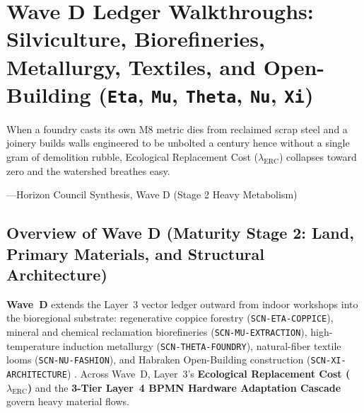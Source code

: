 \chapter{Wave D Ledger Walkthroughs: Silviculture, Biorefineries, Metallurgy, Textiles, and Open-Building (\texttt{Eta}, \texttt{Mu}, \texttt{Theta}, \texttt{Nu}, \texttt{Xi})}
\label{ch:wave-d-walkthroughs}

\epigraph{When a foundry casts its own M8 metric dies from reclaimed scrap steel and a joinery builds walls engineered to be unbolted a century hence without a single gram of demolition rubble, Ecological Replacement Cost ($\lambda_{\mathrm{ERC}}$) collapses toward zero and the watershed breathes easy.}{---Horizon Council Synthesis, Wave D (Stage 2 Heavy Metabolism)}

\section{Overview of Wave D (Maturity Stage 2: Land, Primary Materials, and Structural Architecture)}
\label{sec:ch12-overview}

\textbf{Wave~D} extends the Layer~3 vector ledger outward from indoor workshops into the bioregional substrate: regenerative coppice forestry (\texttt{SCN-ETA-COPPICE}), mineral and chemical reclamation biorefineries (\texttt{SCN-MU-EXTRACTION}), high-temperature induction metallurgy (\texttt{SCN-THETA-FOUNDRY}), natural-fiber textile looms (\texttt{SCN-NU-FASHION}), and Habraken Open-Building construction (\texttt{SCN-XI-ARCHITECTURE}) \parencite{habraken1972supports}. Across Wave~D, Layer~3's \textbf{Ecological Replacement Cost ($\lambda_{\mathrm{ERC}}$)} and the \textbf{3-Tier Layer~4 BPMN Hardware Adaptation Cascade} govern heavy material flows.

